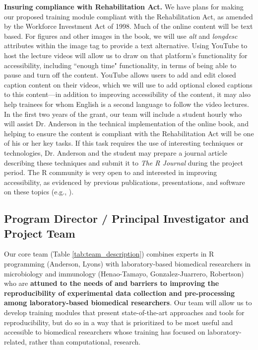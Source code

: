 \documentclass[pdftex,english,11pt,parskip=half]{scrartcl}
\begin{document}
\noindent \textbf{Insuring compliance with Rehabilitation Act.} We have plans
for making our proposed training module compliant with the
Rehabilitation Act, as amended by the Workforce Investment
Act of 1998. Much of the online content will be text based. For figures and
other images in the book, we will use \textit{alt} and \textit{longdesc} attributes
within the image tag to provide a text alternative. Using YouTube to host the
lecture videos will allow us to draw on that platform's functionality for accessibility,
including ``enough time" functionality, in terms of being able to pause and turn
off the content. YouTube allows users to add and edit closed caption content on
their videos, which we will use to add optional closed captions to this
content---in addition to improving accessibility of the content, it may also
help trainees for whom English is a second language to follow the video lectures. In
the first two years of the grant, our team will include a student hourly who will assist
Dr. Anderson in the technical implementation of the online book, and helping to
ensure the content is compliant with the Rehabilitation Act will be one of his or her
key tasks. If this task requires the use of interesting techniques or
technologies, Dr. Anderson and the student may prepare a journal article
describing these techniques and submit it to \textit{The R Journal} during the
project period. The R community is very open to and interested in improving
accessibility, as evidenced by previous publications, presentations, and
software on these topics (e.g., \cite{uswebr, godfrey2013statistical}).

\subsection{Program Director / Principal Investigator and Project Team}



Our core team (Table \ref{tab:team_description}) combines experts in R programming (Anderson, Lyons) with
laboratory-based biomedical researchers in microbiology and immunology
(Henao-Tamayo, Gonzalez-Juarrero, Robertson) who are \textbf{attuned to the
needs of and barriers to improving the reproducibility of experimental data
collection and pre-processing among laboratory-based biomedical researchers}.
Our team will allow us to develop training modules that present state-of-the-art
approaches and tools for reproducibility, but do so in a way that is prioritized
to be most useful and accessible to biomedical researchers whose training has
focused on laboratory-related, rather than computational, research. 
\end{document}
